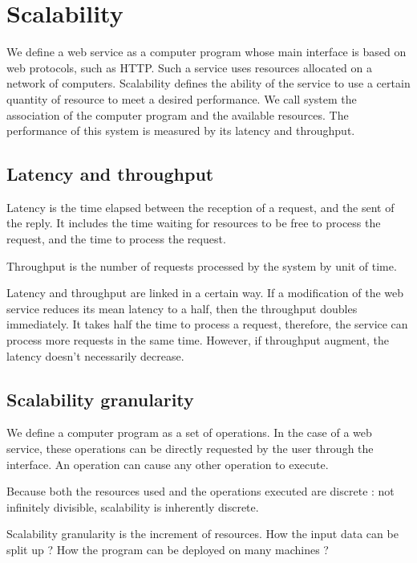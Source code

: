 \section{Scalability}



We define a web service as a computer program whose main interface is based on web protocols, such as HTTP.
Such a service uses resources allocated on a network of computers.
Scalability defines the ability of the service to use a certain quantity of resource to meet a desired performance.
We call system the association of the computer program and the available resources. 
The performance of this system is measured by its latency and throughput.

\subsection{Latency and throughput}

Latency is the time elapsed between the reception of a request, and the sent of the reply.
It includes the time waiting for resources to be free to process the request, and the time to process the request.

Throughput is the number of requests processed by the system by unit of time.

Latency and throughput are linked in a certain way.
If a modification of the web service reduces its mean latency to a half, then the throughput doubles immediately.
It takes half the time to process a request, therefore, the service can process more requests in the same time.
However, if throughput augment, the latency doesn't necessarily decrease.

\subsection{Scalability granularity}

We define a computer program as a set of operations.
In the case of a web service, these operations can be directly requested by the user through the interface.
An operation can cause any other operation to execute.

Because both the resources used and the operations executed are discrete : not infinitely divisible, scalability is inherently discrete.


Scalability granularity is the increment of resources.
How the input data can be split up ?
How the program can be deployed on many machines ?






